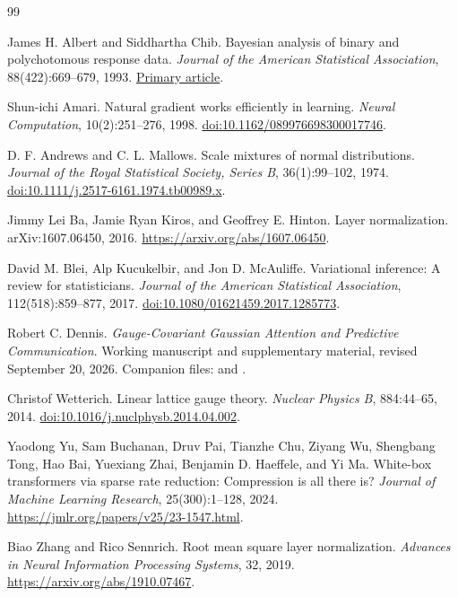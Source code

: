 \documentclass[11pt]{article}
\begin{document}
\begin{thebibliography}{99}
\raggedright
{}
James H. Albert and Siddhartha Chib.
Bayesian analysis of binary and polychotomous response data.
\emph{Journal of the American Statistical Association}, 88(422):669--679, 1993.
\href{https://stat.cmu.edu/~brian/905-2009/all-papers/albert-chib-1993.pdf}{Primary article}.

Shun-ichi Amari.
Natural gradient works efficiently in learning.
\emph{Neural Computation}, 10(2):251--276, 1998.
\href{https://doi.org/10.1162/089976698300017746}{doi:10.1162/089976698300017746}.

D. F. Andrews and C. L. Mallows.
Scale mixtures of normal distributions.
\emph{Journal of the Royal Statistical Society, Series B}, 36(1):99--102, 1974.
\href{https://doi.org/10.1111/j.2517-6161.1974.tb00989.x}{doi:10.1111/j.2517-6161.1974.tb00989.x}.

Jimmy Lei Ba, Jamie Ryan Kiros, and Geoffrey E. Hinton.
Layer normalization.
arXiv:1607.06450, 2016.
\url{https://arxiv.org/abs/1607.06450}.

David M. Blei, Alp Kucukelbir, and Jon D. McAuliffe.
Variational inference: A review for statisticians.
\emph{Journal of the American Statistical Association}, 112(518):859--877, 2017.
\href{https://doi.org/10.1080/01621459.2017.1285773}{doi:10.1080/01621459.2017.1285773}.

Robert C. Dennis.
\emph{Gauge-Covariant Gaussian Attention and Predictive Communication}.
Working manuscript and supplementary material, revised September 20, 2026.
Companion files:  and .

Christof Wetterich.
Linear lattice gauge theory.
\emph{Nuclear Physics B}, 884:44--65, 2014.
\href{https://doi.org/10.1016/j.nuclphysb.2014.04.002}{doi:10.1016/j.nuclphysb.2014.04.002}.

Yaodong Yu, Sam Buchanan, Druv Pai, Tianzhe Chu, Ziyang Wu, Shengbang Tong,
Hao Bai, Yuexiang Zhai, Benjamin D. Haeffele, and Yi Ma.
White-box transformers via sparse rate reduction: Compression is all there is?
\emph{Journal of Machine Learning Research}, 25(300):1--128, 2024.
\url{https://jmlr.org/papers/v25/23-1547.html}.

Biao Zhang and Rico Sennrich.
Root mean square layer normalization.
\emph{Advances in Neural Information Processing Systems}, 32, 2019.
\url{https://arxiv.org/abs/1910.07467}.
\end{thebibliography}
\end{document}
